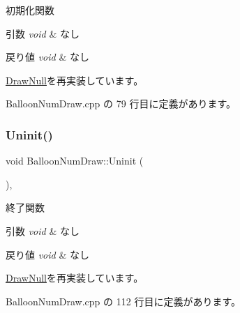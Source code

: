 初期化関数 


\begin{DoxyParams}{引数}
{\em void} & なし \\
\hline
\end{DoxyParams}

\begin{DoxyRetVals}{戻り値}
{\em void} & なし \\
\hline
\end{DoxyRetVals}


\mbox{\hyperlink{class_draw_null_a20aef1e54c1a158b741bfd731e18efdf}{Draw\+Null}}を再実装しています。



 Balloon\+Num\+Draw.\+cpp の 79 行目に定義があります。

\mbox{\label{class_balloon_num_draw_a178dd82afc9c554729b66ccfe65ad212}} 
\subsubsection{\texorpdfstring{Uninit()}{Uninit()}}
{\footnotesize\ttfamily void Balloon\+Num\+Draw\+::\+Uninit (\begin{DoxyParamCaption}{ }\end{DoxyParamCaption})\hspace{0.3cm}{\ttfamily [override]}, {\ttfamily [virtual]}}



終了関数 


\begin{DoxyParams}{引数}
{\em void} & なし \\
\hline
\end{DoxyParams}

\begin{DoxyRetVals}{戻り値}
{\em void} & なし \\
\hline
\end{DoxyRetVals}


\mbox{\hyperlink{class_draw_null_a6e81d63efab7333e8d0e8af99362a4d9}{Draw\+Null}}を再実装しています。



 Balloon\+Num\+Draw.\+cpp の 112 行目に定義があります。

\mbox{\label{class_balloon_num_draw_a448d1635bbf6457187d76818b8c0aa88}} 
